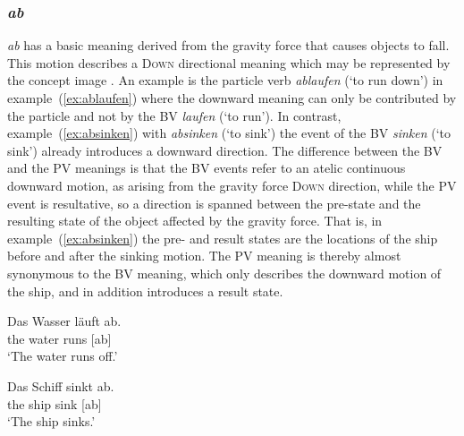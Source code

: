 \documentclass[output=paper]{langsci/langscibook}
\begin{document}
\vspace{+1mm}
\subsubsection{\textit{ab}}

\textit{ab} has a basic meaning derived from the gravity force that
causes objects to fall. This motion describes a \textsc{Down}
directional meaning which may be represented by the concept image
. An example is the particle verb \textit{ablaufen}
(`to run down') in example~(\ref{ex:ablaufen}) where the downward
meaning can only be contributed by the particle and not by the BV
\textit{laufen} (`to run'). In contrast, example~(\ref{ex:absinken})
with \textit{absinken} (`to sink')
the event of the BV \textit{sinken} (`to sink')
already introduces a downward direction. The difference between the BV
and the PV meanings is that the BV events refer to an atelic
continuous downward motion, as arising from the gravity force
\textsc{Down} direction, while the PV event is resultative, so a
direction is spanned between the pre-state and the resulting state of
the object affected by the gravity force. That is, in
example~(\ref{ex:absinken}) the pre- and result states are the
locations of the ship before and after the sinking motion. The PV
meaning is thereby almost synonymous to the BV meaning, which only
describes the downward motion of the ship, and in addition introduces
a result state.

\ea\label{ex:ablaufen}
\gll Das Wasser läuft ab.\\
the water runs [ab]\\
\glt `The water runs off.'
\z

\ea\label{ex:absinken}
\gll Das Schiff sinkt ab.\\
the ship sink [ab]\\
\glt `The ship sinks.'
\z
  
\end{document}
